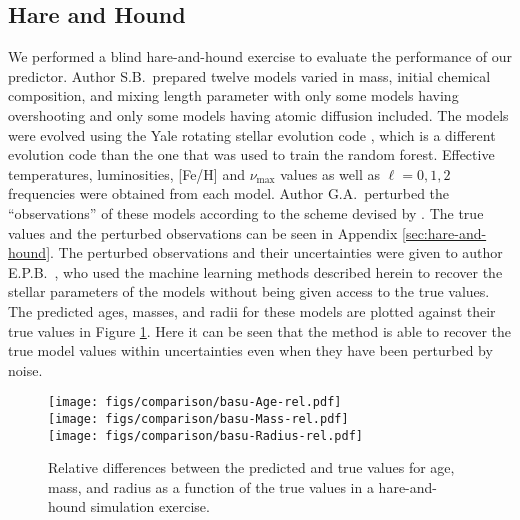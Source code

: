 \documentclass[iop,apj,twocolappendix]{emulateapj}
\begin{document}
\subsection{Hare and Hound} 
We performed a blind hare-and-hound exercise to evaluate the performance of our predictor. Author S.B.\ prepared twelve models varied in mass, initial chemical composition, and mixing length parameter with only some models having overshooting and only some models having atomic diffusion included. The models were evolved using the Yale rotating stellar evolution code \citep[YREC,][]{2008Ap&SS.316...31D}, which is a different evolution code than the one that was used to train the random forest. Effective temperatures, luminosities, [Fe/H] and $\nu_{\max}$ values as well as $\ell=0,1,2$ frequencies were obtained from each model. Author G.A.\  perturbed the ``observations'' of these models according to the scheme devised by \citet{spaceinn}. The true values and the perturbed observations can be seen in Appendix \ref{sec:hare-and-hound}. The perturbed observations and their uncertainties were given to author E.P.B.\ , who used the machine learning methods described herein to recover the stellar parameters of the models without being given access to the true values. The predicted ages, masses, and radii for these models are plotted against their true values in Figure \ref{fig:hare-comparison}. Here it can be seen that the method is able to recover the true model values within uncertainties even when they have been perturbed by noise. 

\begin{figure}
    \centering
    \texttt{[image: figs/comparison/basu-Age-rel.pdf]}\\
    \texttt{[image: figs/comparison/basu-Mass-rel.pdf]}\\
    \texttt{[image: figs/comparison/basu-Radius-rel.pdf]}
    \caption{Relative differences between the predicted and true values for age, mass, and radius as a function of the true values in a hare-and-hound simulation exercise.%
    \label{fig:hare-comparison}}
\end{figure}


\end{document}
